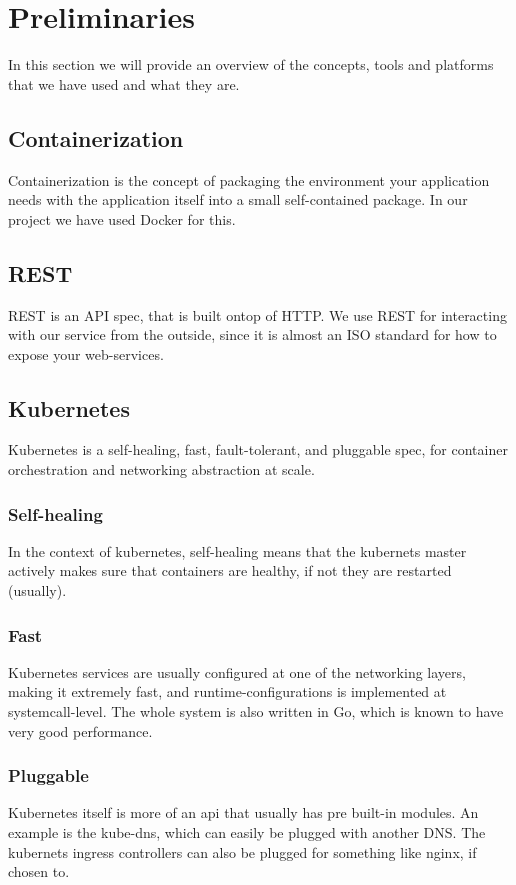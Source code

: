 
\section{Preliminaries}\label{sec:preliminaries}
In this section we will provide an overview of the concepts, tools and platforms that we have used and what they are.
\subsection{Containerization}
Containerization is the concept of packaging the environment your application needs with the application itself into a small self-contained package.
In our project we have used Docker for this.
\subsection{REST}
REST is an API spec, that is built ontop of HTTP. We use REST for interacting with our service from the outside, since it is almost an ISO standard for how to expose your web-services.
\subsection{Kubernetes}
Kubernetes is a self-healing, fast, fault-tolerant, and pluggable spec, for container orchestration and networking abstraction at scale. \cite{kubernetesDocs}
\subsubsection{Self-healing}
In the context of kubernetes, self-healing means that the kubernets master actively makes sure that containers are healthy, if not they are restarted (usually).
\subsubsection{Fast}
Kubernetes services are usually configured at one of the networking layers, making it extremely fast, and runtime-configurations is implemented at systemcall-level.
The whole system is also written in Go, which is known to have very good performance.
\subsubsection{Pluggable}
Kubernetes itself is more of an api that usually has pre built-in modules.
An example is the kube-dns, which can easily be plugged with another DNS.
The kubernets ingress controllers can also be plugged for something like nginx, if chosen to.
